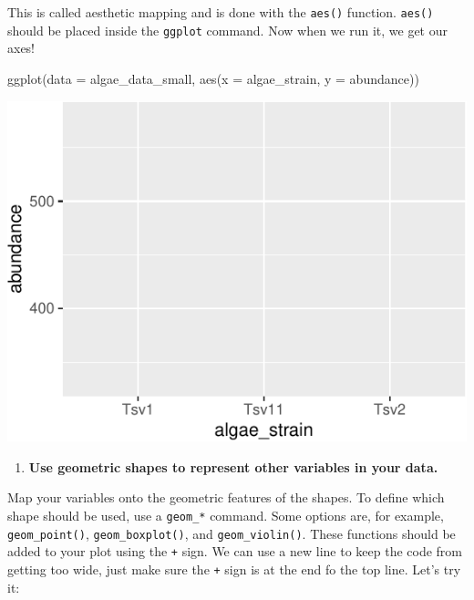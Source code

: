 \documentclass[
]{krantz}
\newenvironment{Shaded}{\begin{snugshade}}{\end{snugshade}}
\newcommand{\AttributeTok}[1]{\textcolor[rgb]{0.77,0.63,0.00}{#1}}
\newcommand{\FunctionTok}[1]{\textcolor[rgb]{0.00,0.00,0.00}{#1}}
\newcommand{\NormalTok}[1]{#1}
\providecommand{\tightlist}{%
  \setlength{\itemsep}{0pt}\setlength{\parskip}{0pt}}
\begin{document}
This is called aesthetic mapping and is done with the \texttt{aes()} function. \texttt{aes()} should be placed inside the \texttt{ggplot} command. Now when we run it, we get our axes!

\begin{Shaded}
\begin{Highlighting}[]
\FunctionTok{ggplot}\NormalTok{(}\AttributeTok{data =}\NormalTok{ algae\_data\_small, }\FunctionTok{aes}\NormalTok{(}\AttributeTok{x =}\NormalTok{ algae\_strain, }\AttributeTok{y =}\NormalTok{ abundance))}
\end{Highlighting}
\end{Shaded}

\begin{center}\includegraphics[width=1\linewidth]{index_files/figure-latex/unnamed-chunk-24-1} \end{center}

\begin{enumerate}
\def\labelenumi{\arabic{enumi}.}
\setcounter{enumi}{2}
\tightlist
\item
  \textbf{Use geometric shapes to represent other variables in your data.}
\end{enumerate}

Map your variables onto the geometric features of the shapes. To define which shape should be used, use a \texttt{geom\_*} command. Some options are, for example, \texttt{geom\_point()}, \texttt{geom\_boxplot()}, and \texttt{geom\_violin()}. These functions should be added to your plot using the \texttt{+} sign. We can use a new line to keep the code from getting too wide, just make sure the \texttt{+} sign is at the end fo the top line. Let's try it:
\end{document}
